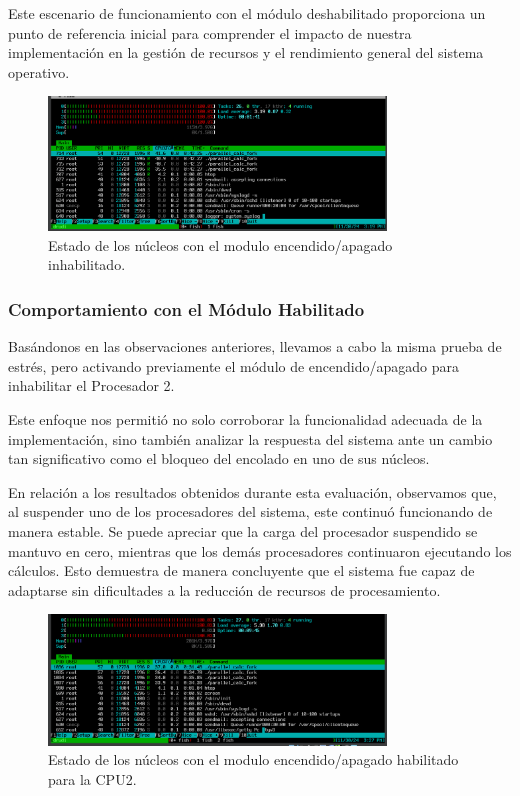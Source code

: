 Este escenario de funcionamiento con el módulo deshabilitado proporciona un punto de referencia inicial para comprender el impacto de nuestra implementación en la gestión de recursos y el rendimiento general del sistema operativo.\par

\begin{figure}[H]
    \centering
    \includegraphics[width=0.8\textwidth]{images/cpuOnOff-result-full-load.png}
    \caption{Estado de los núcleos con el modulo encendido/apagado inhabilitado.}
    \label{fig:cpuOnOff-result-full-load}
\end{figure}

\subsubsection{Comportamiento con el Módulo Habilitado}
Basándonos en las observaciones anteriores, llevamos a cabo la misma prueba de estrés, pero activando previamente el módulo de encendido/apagado para inhabilitar el Procesador 2.\par

Este enfoque nos permitió no solo corroborar la funcionalidad adecuada de la implementación, sino también analizar la respuesta del sistema ante un cambio tan significativo como el bloqueo del encolado en uno de sus núcleos.\par

En relación a los resultados obtenidos durante esta evaluación, observamos que, al suspender uno de los procesadores del sistema, este continuó funcionando de manera estable. Se puede apreciar que la carga del procesador suspendido se mantuvo en cero, mientras que los demás procesadores continuaron ejecutando los cálculos. Esto demuestra de manera concluyente que el sistema fue capaz de adaptarse sin dificultades a la reducción de recursos de procesamiento.\par

\begin{figure}[H]
    \centering
    \includegraphics[width=0.8\textwidth]{images/cpuOnOff-result-1CPU.png}
    \caption{Estado de los núcleos con el modulo encendido/apagado habilitado para la CPU2.}
    \label{fig:cpuOnOff-result-1cpu}
\end{figure}

